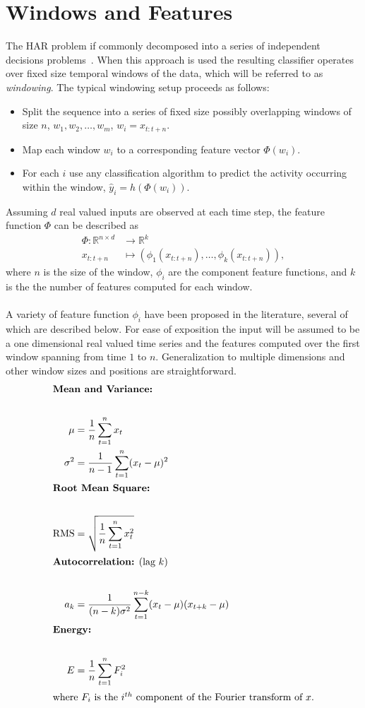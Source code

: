 \documentclass[12pt]{report}
\newcommand{\1}[0]{\mathbbm{1}}
\newcommand{\seq}[3]{\ensuremath{#1_{{#2}:{#3}}}}
\begin{document}
\section{Windows and Features}
\label{sec:HAR Windows and Features}
The \ac{HAR} problem if commonly decomposed into a series of independent decisions
problems~\cite{assembly-activity,tutorial-bulling,ms-activity,phone-kwapisz}.
When this approach is used the resulting classifier operates over fixed size temporal
windows of the data, which will be referred to as \emph{windowing}.
The typical windowing setup proceeds as follows:
\begin{itemize}
    \item Split the sequence into a series of fixed size possibly overlapping windows
          of size $n$, $w_1, w_2, \ldots, w_m$, $w_i = \seq{x}{t}{t + n}$.
    \item Map each window $w_i$ to a corresponding feature vector $\Phi(w_i)$.
    \item For each $i$ use any classification algorithm to predict the activity occurring
          within the window, $\hat{y}_i = h(\Phi(w_i))$.
\end{itemize}
Assuming $d$ real valued inputs are observed at each time step, the feature function $\Phi$
can be described as
\begin{align*}
    \Phi \colon \mathbb{R}^{n \times d} & \longrightarrow \mathbb{R}^{k}\\
    \seq{x}{t}{t + n} & \longmapsto (\phi_1(\seq{x}{t}{t + n}), \ldots, \phi_k(\seq{x}{t}{t + n})),
\end{align*}
where $n$ is the size of the window, $\phi_i$ are the component feature functions,
and $k$ is the the number of features computed for each window.
\\\\
A variety of feature function $\phi_i$ have been proposed in the literature,
several of which are described below. For ease of exposition the input
will be assumed to be a one dimensional real valued time series and the features computed
over the first window spanning from time $1$ to $n$. Generalization to multiple dimensions
and other window sizes and positions are straightforward.
\begin{align*}
    \intertext{\textbf{Mean and Variance:}} \\
    \mu &= \frac{1}{n}\sum_{t=1}^n x_t \\
    \sigma^2 &= \frac{1}{n-1} \sum_{t=1}^n (x_t - \mu)^2 \\
    \intertext{\textbf{Root Mean Square:}} \\
    \text{RMS} &= \sqrt{\frac{1}{n} \sum_{t=1}^n x_t^2} \\
    \intertext{\textbf{Autocorrelation:} (lag $k$)} \\
    a_k &= \frac{1}{(n-k)\sigma^2} \sum_{t=1}^{n-k}(x_t - \mu)(x_{t+k} - \mu) \\
    \intertext{\textbf{Energy:}} \\
    E &= \frac{1}{n} \sum_{t=1}^n F_i^2\\
    \intertext{where $F_i$ is the $i^{th}$ component of the Fourier transform of $x$.}
\end{align*}
\end{document}
